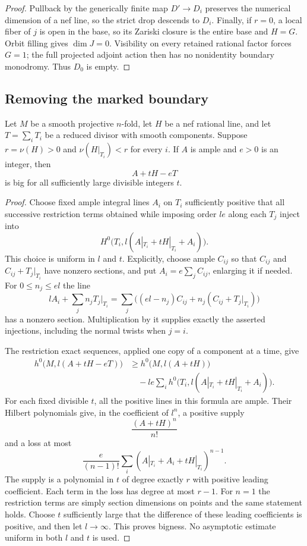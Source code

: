 \begin{proof}
Pullback by the generically finite map $D'\to D_i$ preserves
the numerical dimension of a nef line, so the strict drop
descends to $D_i$.  Finally, if $r=0$, a local fiber of $j$
is open in the base, so its Zariski closure is the entire
base and $H=G$.  Orbit filling gives $\dim J=0$.
Visibility on every retained rational factor forces
$G=1$; the full projected adjoint action then has no
nonidentity boundary monodromy.  Thus $D_0$ is empty.
\end{proof}

\subsection{Removing the marked boundary}

\begin{lemma}\label{lem:boundary-remove}
Let $M$ be a smooth projective $n$-fold, let $H$ be a nef
rational line, and let $T=\sum_i T_i$ be a reduced divisor
with smooth components.  Suppose $r=\nu(H)>0$ and
$\nu(H|_{T_i})<r$ for every $i$.  If $A$ is ample and
$e>0$ is an integer, then
\[
                         A+tH-eT
\]
is big for all sufficiently large divisible integers $t$.
\end{lemma}

\begin{proof}
Choose fixed ample integral lines $A_i$ on $T_i$ sufficiently
positive that all successive restriction terms obtained
while imposing order $le$ along each $T_j$ inject into
\[
 H^0\bigl(T_i,l(A|_{T_i}+tH|_{T_i}+A_i)\bigr).
\]
This choice is uniform in $l$ and $t$.  Explicitly, choose
ample $C_{ij}$ so that $C_{ij}$ and $C_{ij}+T_j|_{T_i}$
have nonzero sections, and put $A_i=e\sum_j C_{ij}$,
enlarging it if needed.  For $0\leq n_j\leq el$ the line
\[
 lA_i+\sum_j n_jT_j|_{T_i}
 =\sum_j\bigl((el-n_j)C_{ij}
                  +n_j(C_{ij}+T_j|_{T_i})\bigr)
\]
has a nonzero section.  Multiplication by it supplies
exactly the asserted injections, including the normal
twists when $j=i$.

The restriction exact sequences, applied one copy of a
component at a time, give
\begin{align*}
 h^0\bigl(M,l(A+tH-eT)\bigr)
 &\geq h^0\bigl(M,l(A+tH)\bigr)\\
 &\quad-le\sum_i
 h^0\bigl(T_i,l(A|_{T_i}+tH|_{T_i}+A_i)\bigr).
\end{align*}
For each fixed divisible $t$, all the positive lines in
this formula are ample.  Their Hilbert polynomials give,
in the coefficient of $l^n$, a positive supply
\[
                         \frac{(A+tH)^n}{n!}
\]
and a loss at most
\[
 \frac{e}{(n-1)!}\sum_i
                (A|_{T_i}+A_i+tH|_{T_i})^{n-1}.
\]
The supply is a polynomial in $t$ of degree exactly $r$
with positive leading coefficient.  Each term in the
loss has degree at most $r-1$.  For $n=1$ the restriction
terms are simply section dimensions on points and the
same statement holds.  Choose $t$ sufficiently large
that the difference of these leading coefficients is
positive, and then let $l\to\infty$.  This proves bigness.
No asymptotic estimate uniform in both $l$ and $t$ is used.
\end{proof}

